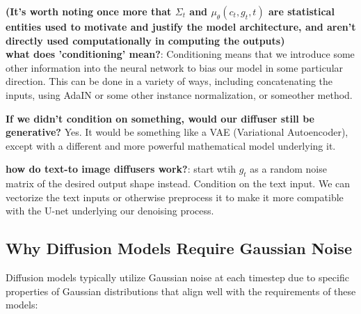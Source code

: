 \documentclass[12pt]{article}
\begin{document}
\textbf{(It's worth noting once more that \(\Sigma_t\) and \(\mu_\theta(c_t, g_t,t)\) are statistical entities used to motivate and justify the model architecture, and aren't directly used computationally in computing the outputs)}\\

\textbf{what does 'conditioning' mean?}: Conditioning means that we introduce some other information into the neural network to bias our model in some particular direction. This can be done in a variety of ways, including concatenating the inputs, using AdaIN or some other instance normalization, or someother method.

\textbf{If we didn't condition on something, would our diffuser still be generative?} Yes. It would be something like a VAE (Variational Autoencoder), except with a different and more powerful mathematical model underlying it. 

\textbf{how do text-to image diffusers work?}: start wtih \(g_t\) as a random noise matrix of the desired output shape instead. Condition on the text input. We can vectorize the text inputs or otherwise preprocess it to make it more compatible with the U-net underlying our denoising process.

\subsection*{Why Diffusion Models Require Gaussian Noise}

Diffusion models typically utilize Gaussian noise at each timestep due to specific properties of Gaussian distributions that align well with the requirements of these models:
\end{document}
